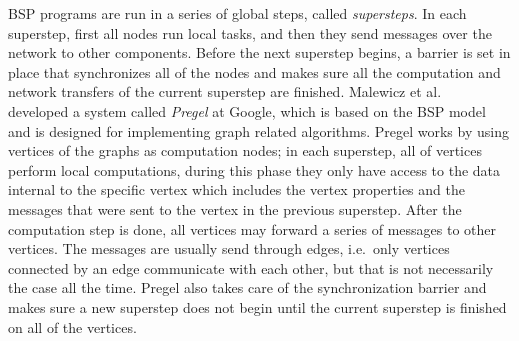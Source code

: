 \documentclass[english]{tktltiki}
\begin{document}
BSP programs are run in a series of global steps, called \textit{supersteps}. In each superstep, first all nodes run local tasks, and then they send messages over the network to other components. Before the next superstep begins, a barrier is set in place that synchronizes all of the nodes and makes sure all the computation and network transfers of the current superstep are finished. Malewicz et al.\ \cite{malewicz10} developed a system called \textit{Pregel} at Google, which is based on the BSP model and is designed for implementing graph related algorithms. Pregel works by using vertices of the graphs as computation nodes; in each superstep, all of vertices perform local computations, during this phase they only have access to the data internal to the specific vertex which includes the vertex properties and the messages that were sent to the vertex in the previous superstep. After the computation step is done, all vertices may forward a series of messages to other vertices. The messages are usually send through edges, i.e.\ only vertices connected by an edge communicate with each other, but that is not necessarily the case all the time. Pregel also takes care of the synchronization barrier and makes sure a new superstep does not begin until the current superstep is finished on all of the vertices.
\end{document}
